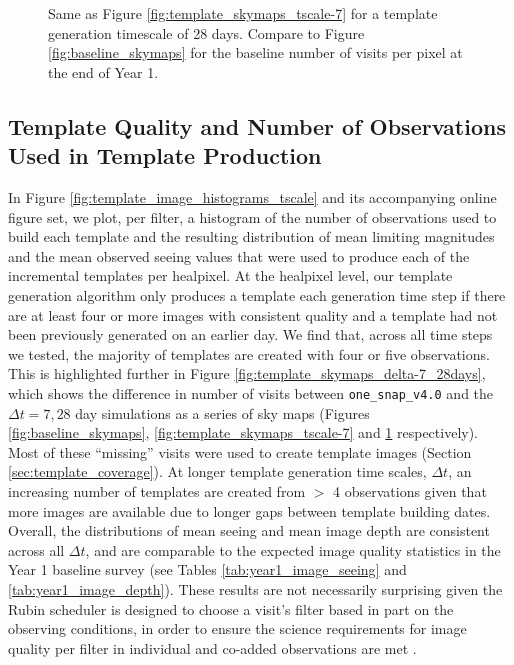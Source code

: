 \documentclass[preprintm,linenumbers]{aastex631}
\newcommand{\baseline}{\texttt{one\_snap\_v4.0}\xspace}
\begin{document}
\begin{figure}
\begin{tabular}{@{}c@{}c@{}}
			\end{tabular}
			\caption{Same as Figure \ref{fig:template_skymaps_tscale-7} for a template generation timescale of 28 days.
				Compare to Figure \ref{fig:baseline_skymaps} for the baseline number of visits per pixel at the end of Year 1.
			}
			\label{fig:template_skymaps_tscale-28}
		\end{figure}

  


		\subsection{Template Quality and Number of Observations Used in Template Production}
		
		In Figure \ref{fig:template_image_histograms_tscale} and its accompanying online figure set, we plot, per filter, a histogram of the number of observations used to build each template and the resulting distribution of mean limiting magnitudes and the mean observed seeing values that were used to produce each of the incremental templates per healpixel. 
  At the healpixel level, our template generation algorithm only produces a template each generation time step if there are at least four or more images with consistent quality and a template had not been previously generated on an earlier day. 
  We find that, across all time steps we tested, the majority of templates are created with four or five observations. 
  This is highlighted further in Figure \ref{fig:template_skymaps_delta-7_28days}, which shows the difference in number of visits between \baseline and the $\Delta t = 7, 28$ day simulations as a series of sky maps (Figures \ref{fig:baseline_skymaps}, \ref{fig:template_skymaps_tscale-7} and \ref{fig:template_skymaps_tscale-28} respectively).
  Most of these ``missing'' visits were used to create template images (Section \ref{sec:template_coverage}).
  At longer template generation time scales, $\Delta t$, an increasing number of templates are created from  $>$ 4 observations given that more images are available due to longer gaps between template building dates. 
  Overall, the distributions of mean seeing and mean image depth are consistent across all $\Delta t$, and are comparable to the expected image quality statistics in the Year 1 baseline survey (see Tables \ref{tab:year1_image_seeing} and \ref{tab:year1_image_depth}). 
  These results are not necessarily surprising given the Rubin scheduler is designed to choose a visit's filter based in part on the observing conditions, in order to ensure the science requirements for image quality per filter in individual and co-added observations are met \citep{lsstSRD}. 
\end{document}
